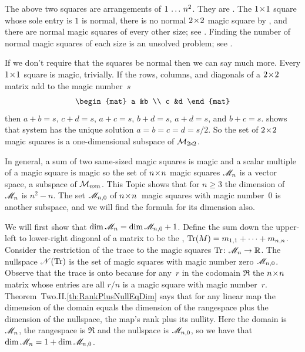 The above two squares are arrangements of $1\,\ldots\, n^2$.
They are .
The $1 \! \times \! 1$ square whose sole entry is $1$ is normal, there is
no normal $2 \! \times \! 2$ magic square by ,
and there are normal magic squares of every other size; 
see \cite{WikipediaMagicSquare}.
Finding the number of normal magic squares of each size is an unsolved
problem;
see \cite{OnlineEncyclopedia}.
 
If we don't require that the squares be normal then we can say much more.
Every $1 \! \times \! 1$ square is magic, trivially.
If the rows, columns, and diagonals of a $2 \! \times \! 2$ matrix add to 
the magic number~$s$
\begin{equation*}
  \begin{mat}
    a  &b  \\
    c  &d
  \end{mat}
\end{equation*}
then $a+b=s$, $c+d=s$, $a+c=s$, $b+d=s$, $a+d=s$, and $b+c=s$.
 shows that
system has the unique solution $a=b=c=d=s/2$.
So the set of $2 \! \times \! 2$ magic squares
is a one-dimensional subspace of $\mathcal{M}_{2 \! \times \! 2}$.

In general, a sum of two same-sized magic squares is magic and a 
scalar multiple of a magic square is magic so the set of 
$n \! \times \! n$ magic squares
$\mathscr{M}_n$ is a vector space, a subspace of $\mathcal{M}_{n \! \times \! n}$.
This Topic shows that for $n\geq 3$ the 
dimension of
$\mathscr{M}_n$ is $n^2-n$.
The set $\mathscr{M}_{n,0}$ of $n \! \times \! n$~magic squares with magic number~$0$ 
is another subspace, and we will find the formula for its dimension also.

We will first show that $\dim\mathscr{M}_n=\dim\mathscr{M}_{n,0}+1$.
Define 
the sum down the upper-left to lower-right diagonal of a matrix
to be the
,
$\operatorname{Tr} (M)=m_{1,1}+\cdots+m_{n,n}$.
Consider the restriction of the trace to the magic squares
$\mbox{$\operatorname{Tr}\colon \mathscr{M}_n\to \mathbb{R}$}$. 
The nullspace $\mathscr{N}(\operatorname{Tr})$ is the set of magic squares with magic
number zero 
$\mathscr{M}_{n,0}$.
Observe that the trace is onto because for any~$r$ in the 
codomain $\Re$ the $n \! \times \! n$ matrix whose entries are all $r/n$ is
a magic square with magic number~$r$.
Theorem~Two.II.\ref{th:RankPlusNullEqDim} says that for any linear map the
dimension of the domain equals the dimension of the rangespace 
plus the dimension of the nullspace,
the map's rank plus its nullity.
Here the domain is $\mathscr{M}_n$, the rangespace is 
$\Re$ and the nullspace is $\mathscr{M}_{n,0}$,
so we have that $\dim\mathscr{M}_n=1+\dim\mathscr{M}_{n,0}$.

